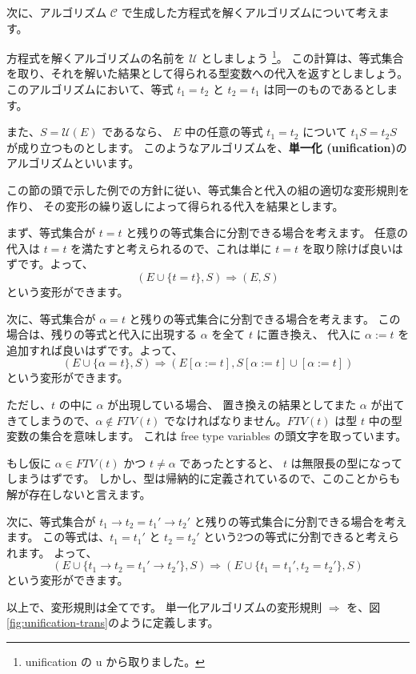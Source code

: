 次に、アルゴリズム $\mathcal C$ で生成した方程式を解くアルゴリズムについて考えます。

方程式を解くアルゴリズムの名前を $\mathcal U$ としましょう
\footnote{unification の u から取りました。}。
この計算は、等式集合を取り、それを解いた結果として得られる型変数への代入を返すとしましょう。
このアルゴリズムにおいて、等式 $t_1 = t_2$ と $t_2 = t_1$ は同一のものであるとします。

また、$S = \mathcal{U}(E)$ であるなら、
$E$ 中の任意の等式 $t_1 = t_2$ について $t_1 S = t_2 S$ が成り立つものとします。
このようなアルゴリズムを、\textbf{単一化 (unification)}のアルゴリズムといいます。

この節の頭で示した例での方針に従い、等式集合と代入の組の適切な変形規則を作り、
その変形の繰り返しによって得られる代入を結果とします。

まず、等式集合が $t = t$ と残りの等式集合に分割できる場合を考えます。
任意の代入は $t = t$ を満たすと考えられるので、これは単に $t = t$ を取り除けば良いはずです。よって、
\[
  (E \cup \{t = t\}, S) \Longrightarrow (E, S)
\]
という変形ができます。

次に、等式集合が $\alpha = t$ と残りの等式集合に分割できる場合を考えます。
この場合は、残りの等式と代入に出現する $\alpha$ を全て $t$ に置き換え、
代入に $\alpha := t$ を追加すれば良いはずです。よって、
\[
  (E \cup \{\alpha = t\}, S) \Longrightarrow (E[\alpha := t], S[\alpha := t] \cup [\alpha := t])
\]
という変形ができます。

ただし、$t$ の中に $\alpha$ が出現している場合、
置き換えの結果としてまた $\alpha$ が出てきてしまうので、$\alpha \notin \mathit{FTV}(t)$
でなければなりません。$\mathit{FTV}(t)$ は型 $t$ 中の型変数の集合を意味します。
これは free type variables の頭文字を取っています。

もし仮に $\alpha \in \mathit{FTV}(t)$ かつ $t \neq \alpha$ であったとすると、
$t$ は無限長の型になってしまうはずです。
しかし、型は帰納的に定義されているので、このことからも解が存在しないと言えます。

次に、等式集合が $t_1 \to t_2 = t_1' \to t_2'$ と残りの等式集合に分割できる場合を考えます。
この等式は、$t_1 = t_1'$ と $t_2 = t_2'$ という2つの等式に分割できると考えられます。
よって、
\[
  (E \cup \{t_1 \to t_2 = t_1' \to t_2'\}, S) \Longrightarrow (E \cup \{t_1 = t_1', t_2 = t_2'\}, S)
\]
という変形ができます。

以上で、変形規則は全てです。
単一化アルゴリズムの変形規則 $\Longrightarrow$ を、図\ref{fig:unification-trans}のように定義します。

